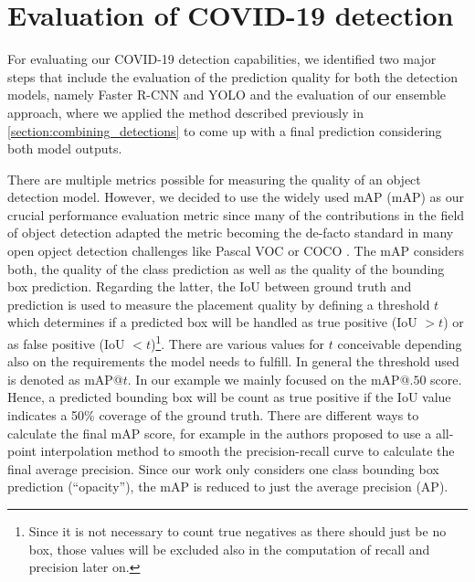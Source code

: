 \section{Evaluation of COVID-19 detection}\label{chapter:eval_rcnn_yolo}
For evaluating our COVID-19 detection capabilities, we identified two major steps that include the evaluation of the prediction quality for both the detection models, namely Faster \ac{R-CNN} and \ac{YOLO} and the evaluation of our ensemble approach, where we applied the method described previously in \ref{section:combining_detections} to come up with a final prediction considering both model outputs. 

There are multiple metrics possible for measuring the quality of an object detection model. However, we decided to use the widely used \acl{mAP} (mAP) as our crucial performance evaluation metric since many of the contributions in the field of object detection adapted the metric becoming the de-facto standard in many open opject detection challenges like Pascal VOC \autocite{everingham2010pascal} or COCO \autocite{coco}. The \ac{mAP} considers both, the quality of the class prediction as well as the quality of the bounding box prediction. Regarding the latter, the \ac{IoU} between ground truth and prediction is used to measure the placement quality by defining a threshold $t$ which determines if a predicted box will be handled as true positive (\ac{IoU} $> t$) or as false positive (\ac{IoU} $< t$)\footnote{Since it is not necessary to count true negatives as there should just be no box, those values will be excluded also in the computation of recall and precision later on.}. There are various values for $t$ conceivable depending also on the requirements the model needs to fulfill. In general the threshold used is denoted as \ac{mAP}@$t$. In our example we mainly focused on the \ac{mAP}@$.50$ score. Hence, a predicted bounding box will be count as true positive if the \ac{IoU} value indicates a 50\% coverage of the ground truth. There are different ways to calculate the final \ac{mAP} score, for example in \autocite{padilla2020survey} the authors proposed to use a all-point interpolation method to smooth the precision-recall curve to calculate the final average precision. Since our work only considers one class bounding box prediction (\enquote{opacity}), the \ac{mAP} is reduced to just the average precision (AP).


